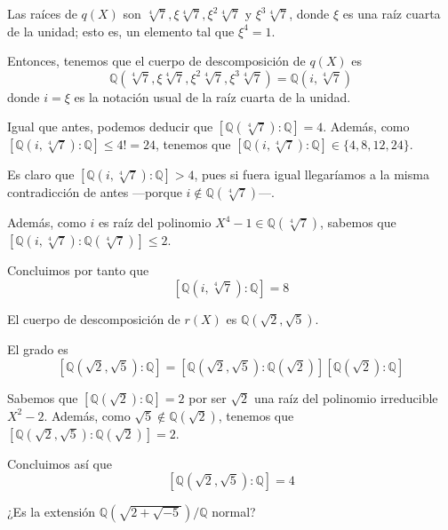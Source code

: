 \documentclass[a4paper, 11pt]{article}
\begin{document}
  \begin{solucion}
      Las raíces de $q(X)$ son $\sqrt[4]{7},\xi\sqrt[4]{7},\xi^2\sqrt[4]{7}$ y $\xi^3\sqrt[4]{7}$, donde $\xi$ es una raíz cuarta de la unidad; esto es, un elemento tal que $\xi^4=1$.

      Entonces, tenemos que el cuerpo de descomposición de $q(X)$ es
      \[
      \mathbb{Q}(\sqrt[4]{7},\xi\sqrt[4]{7},\xi^2\sqrt[4]{7},\xi^3\sqrt[4]{7}) = \mathbb{Q}(i,\sqrt[4]{7})
      \]
      donde $i=\xi$ es la notación usual de la raíz cuarta de la unidad.

      Igual que antes, podemos deducir que $[\mathbb{Q}(\sqrt[4]{7}):\mathbb{Q}] = 4$. Además, como $[\mathbb{Q}(i,\sqrt[4]{7}):\mathbb{Q}] \leq 4! = 24$, tenemos que $[\mathbb{Q}(i,\sqrt[4]{7}):\mathbb{Q}] \in \{4,8,12,24\}$.

      Es claro que $[\mathbb{Q}(i,\sqrt[4]{7}):\mathbb{Q}] > 4$, pues si fuera igual llegaríamos a la misma contradicción de antes ---porque $i\notin\mathbb{Q}(\sqrt[4]{7})$---.

      Además, como $i$ es raíz del polinomio $X^4-1\in\mathbb{Q}(\sqrt[4]{7})$, sabemos que $[\mathbb{Q}(i,\sqrt[4]{7}):\mathbb{Q}(\sqrt[4]{7})]\leq 2$.

      Concluimos por tanto que
      \[
      [\mathbb{Q}(i,\sqrt[4]{7}):\mathbb{Q}] = 8
      \]
  \end{solucion}

  \begin{apartado}
  \end{apartado}

  \begin{solucion}
      El cuerpo de descomposición de $r(X)$ es $\mathbb{Q}(\sqrt{2},\sqrt{5})$.

      El grado es
      \[
      [\mathbb{Q}(\sqrt{2},\sqrt{5}):\mathbb{Q}] = [\mathbb{Q}(\sqrt{2},\sqrt{5}):\mathbb{Q}(\sqrt{2})][\mathbb{Q}(\sqrt{2}):\mathbb{Q}]
      \]

      Sabemos que $[\mathbb{Q}(\sqrt{2}):\mathbb{Q}] = 2$ por ser $\sqrt{2}$ una raíz del polinomio irreducible $X^2-2$. Además, como $\sqrt{5}\notin\mathbb{Q}(\sqrt{2})$, tenemos que $[\mathbb{Q}(\sqrt{2},\sqrt{5}):\mathbb{Q}(\sqrt{2})] = 2$.

      Concluimos así que
      \[
      [\mathbb{Q}(\sqrt{2},\sqrt{5}):\mathbb{Q}] = 4
      \]

  \end{solucion}

  \newpage
  \begin{ejercicio}
      ¿Es la extensión $\mathbb{Q}\left(\sqrt{2+\sqrt{-5}}\right)/\mathbb{Q}$ normal?
  \end{ejercicio}
\end{document}
